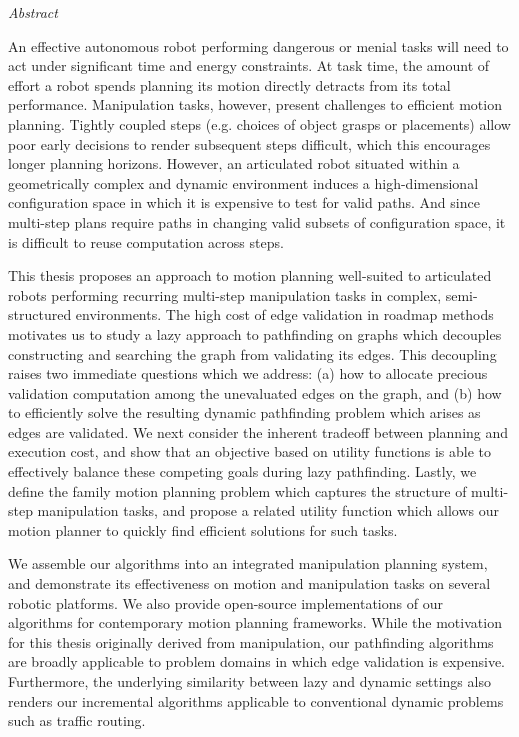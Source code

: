 
\begin{fullwidth}
\begin{adjustwidth}{1in}{1in}

{\LARGE \emph{Abstract}}

\vspace{0.2in}

An effective autonomous robot performing dangerous or menial tasks
will need to act under significant time and energy constraints.
At task time,
the amount of effort a robot spends planning its motion directly
detracts from its total performance.
Manipulation tasks, however, present challenges
to efficient motion planning.
Tightly coupled steps (e.g. choices of object grasps or placements)
allow poor early decisions to render subsequent steps difficult,
which this encourages longer planning horizons.
However,
an articulated robot
situated within a geometrically complex and dynamic environment
induces a high-dimensional configuration space
in which it is expensive to test for valid paths.
And since multi-step plans
require paths in changing valid subsets of configuration space,
it is difficult to reuse computation across steps.

\vspace{0.2cm}

This thesis proposes an approach to motion planning
well-suited to articulated robots
performing recurring multi-step manipulation tasks
in complex, semi-structured environments.
The high cost of edge validation in roadmap methods
motivates us to study a lazy approach to pathfinding on graphs
which decouples constructing and searching the graph
from validating its edges.
This decoupling raises two immediate questions which we address:
(a) how to allocate precious validation computation
among the unevaluated edges on the graph,
and (b) how to efficiently solve the resulting dynamic pathfinding
problem which arises as edges are validated.
We next consider the inherent tradeoff
between planning and execution cost,
and show that an objective based on utility functions
is able to effectively balance these competing goals
during lazy pathfinding.
Lastly,
we define the family motion planning problem
which captures the structure of multi-step manipulation tasks,
and propose a related utility function which allows our
motion planner to quickly find efficient solutions for such tasks.

\vspace{0.2cm}

We assemble our algorithms into an integrated manipulation planning
system,
and demonstrate its effectiveness on motion and manipulation tasks
on several robotic platforms.
We also provide open-source implementations of our algorithms
for contemporary motion planning frameworks.
While the motivation for this thesis originally derived
from manipulation,
our pathfinding algorithms are broadly applicable to problem domains
in which edge validation is expensive.
Furthermore,
the underlying similarity between lazy and dynamic settings
also renders our incremental algorithms applicable
to conventional dynamic problems such as traffic routing.


\end{adjustwidth}
\end{fullwidth}
